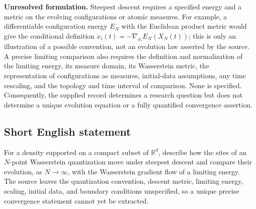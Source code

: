 \documentclass[11pt]{article}
\newcommand{\R}{\mathbb{R}}
\begin{document}
\textbf{Unresolved formulation.} Steepest descent requires a specified energy and a metric on the evolving configurations or atomic measures. For example, a differentiable configuration energy \(E_N\) with the Euclidean product metric would give the conditional definition \(\dot x_i(t)=-\nabla_{x_i}E_N(X_N(t))\); this is only an illustration of a possible convention, not an evolution law asserted by the source. A precise limiting comparison also requires the definition and normalization of the limiting energy, its measure domain, its Wasserstein metric, the representation of configurations as measures, initial-data assumptions, any time rescaling, and the topology and time interval of comparison. None is specified. Consequently, the supplied record determines a research question but does not determine a unique evolution equation or a fully quantified convergence assertion.
\subsection{Short English statement}
For a density supported on a compact subset of \(\R^d\), describe how the sites of an \(N\)-point Wasserstein quantization move under steepest descent and compare their evolution, as \(N\to\infty\), with the Wasserstein gradient flow of a limiting energy. The source leaves the quantization convention, descent metric, limiting energy, scaling, initial data, and boundary conditions unspecified, so a unique precise convergence statement cannot yet be extracted.
\end{document}
